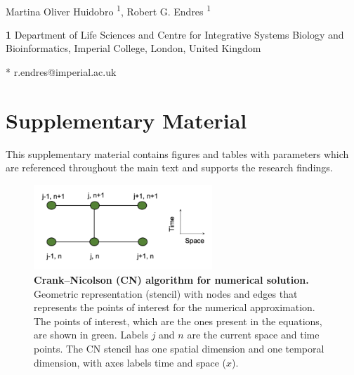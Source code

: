 \documentclass[10pt,letterpaper]{article}
\begin{document}
\vspace*{0.2in}

\begin{flushleft}
{\Large
\textbf{} %
}
\newline
\\
Martina Oliver Huidobro \textsuperscript{1},
Robert G. Endres \textsuperscript{1}


\bigskip
\textbf{1} Department of Life Sciences and Centre for Integrative Systems Biology and Bioinformatics, Imperial College, London, United Kingdom
\\
\bigskip

* r.endres@imperial.ac.uk

\end{flushleft}



\section*{Supplementary Material}

This supplementary material contains figures and tables with parameters which are referenced throughout the main text and supports the research findings.

\newcommand{\beginsupplement}{%
    \setcounter{table}{0}
    \renewcommand{\thetable}{S\arabic{table}}%
    \setcounter{figure}{0}
    \renewcommand{\thefigure}{S\arabic{figure}}%
}
\beginsupplement

\begin{figure}[!ht]
    \center
    \includegraphics[width=0.6\textwidth]{figures/stencils}

    \caption{{\bf Crank–Nicolson (CN) algorithm for numerical solution.}  Geometric representation (stencil) with nodes and edges that represents the points of interest for the numerical approximation. The points of interest, which are the ones present in the equations, are shown in green. Labels $j$ and $n$ are the current space and time points. The CN stencil has one spatial dimension and one temporal dimension, with axes labels time and space ($x$). }   \label{sup_fig1}
\end{figure}
\end{document}

